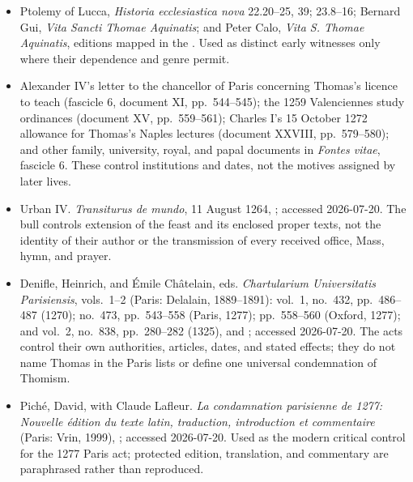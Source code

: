 \begin{itemize}
\item Ptolemy of Lucca, \emph{Historia ecclesiastica nova} 22.20--25, 39;
23.8--16; Bernard Gui, \emph{Vita Sancti Thomae Aquinatis}; and Peter Calo,
\emph{Vita S. Thomae Aquinatis}, editions mapped in the
.  Used as distinct early witnesses only where their dependence and
genre permit.

\item Alexander IV's letter to the chancellor of Paris concerning Thomas's
licence to teach (fascicle 6, document XI, pp.~544--545); the 1259 Valenciennes
study ordinances (document XV, pp.~559--561); Charles I's 15 October 1272
allowance for Thomas's Naples lectures (document XXVIII, pp.~579--580); and
other family, university, royal, and papal documents in \emph{Fontes vitae},
fascicle 6.  These control institutions and dates, not the motives assigned by
later lives.

\item Urban IV.  \emph{Transiturus de mundo}, 11 August 1264,
; accessed
2026-07-20.  The bull controls extension of the feast and its enclosed proper
texts, not the identity of their author or the transmission of every received
office, Mass, hymn, and prayer.

\item Denifle, Heinrich, and Émile Châtelain, eds.  \emph{Chartularium
Universitatis Parisiensis}, vols.~1--2 (Paris: Delalain, 1889--1891): vol.~1,
no.~432, pp.~486--487 (1270); no.~473, pp.~543--558 (Paris, 1277); pp.~558--560
(Oxford, 1277); and vol.~2, no.~838, pp.~280--282 (1325),
 and
;
accessed 2026-07-20.  The acts control their own authorities, articles, dates,
and stated effects; they do not name Thomas in the Paris lists or define one
universal condemnation of Thomism.

\item Piché, David, with Claude Lafleur.  \emph{La condamnation parisienne de
1277: Nouvelle édition du texte latin, traduction, introduction et
commentaire} (Paris: Vrin, 1999),
; accessed 2026-07-20.  Used as the modern critical control
for the 1277 Paris act; protected edition, translation, and commentary are
paraphrased rather than reproduced.


\end{itemize}
